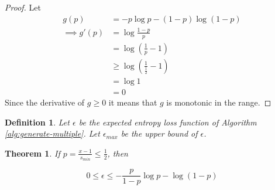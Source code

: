 \documentclass[lettersize,journal]{IEEEtran}
\newtheorem{definition}{Definition}
\newtheorem{theorem}{Theorem}
\begin{document}
\begin{proof}
    Let
    \begin{align}
        g(p) & = -p\log p - (1-p)\log(1-p) \\
        \implies g'(p)
            & = \log\frac{1-p}{p} \\ 
            &= \log(\frac{1}{p}-1) \\
            &\ge \log(\frac{1}{\frac{1}{2}}-1) \\
            &= \log1 \\ 
            &= 0 
    \end{align}
Since the derivative of $g\ge 0$ it means that $g$ is monotonic in the range.
\end{proof}

\begin{definition}
    Let $\epsilon$ be the expected entropy loss function of Algorithm \ref{alg:generate-multiple}. Let $\epsilon_{max}$ be the upper bound of $\epsilon$.
\end{definition}

\begin{theorem}
    \label{thm:loss}
If $p = \frac{x-1}{s_{min}} \le \frac{1}{2}$, then

\begin{equation}
0 \le \epsilon \le -\frac{p}{1-p}\log p - \log(1-p)
\end{equation}

\end{theorem}
\end{document}

